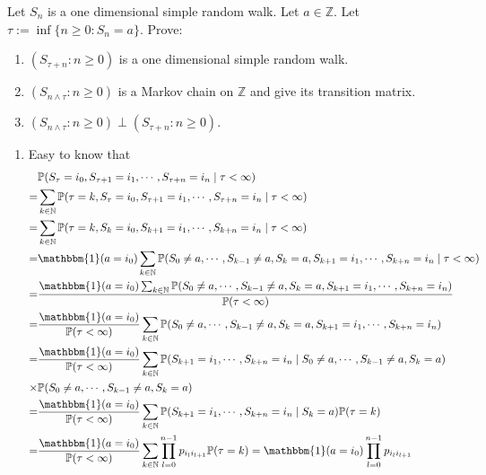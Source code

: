 \documentclass{ctexart}
\begin{document}
\begin{problem}\label{pro:2}
  Let \(S_n\) is a one dimensional simple random walk. Let \(a \in \mathbb{Z}\).
  Let \(\tau := \inf \{n \geq 0: S_n =a\}\).
  Prove:
  \begin{enumerate}
    \item \((S_{\tau + n}:n \geq 0)\) is a one dimensional simple random walk.
    \item \((S_{n \wedge \tau }:n \geq 0)\) is a Markov chain on \(\mathbb{Z}\) and give its
      transition matrix.
    \item \((S_{n \wedge \tau}:n \geq 0) \perp (S_{\tau + n}: n \geq 0)\).
  \end{enumerate}
\end{problem}
\begin{solution}
  \begin{enumerate}
    \item Easy to know that
      \[
        \begin{aligned}
           & \mathbb{P}(S_\tau=i_0,S_{\tau+1}=i_1,\cdots,S_{\tau+n}=i_n \mid \tau<\infty)
          \\= & \sum_{k \in \mathbb{N}}\mathbb{P}(\tau=k,S_\tau=i_0,S_{\tau+1}=i_1,\cdots,S_{\tau+n}=i_n \mid \tau<\infty)
          \\= & \sum_{k \in \mathbb{N}}\mathbb{P}(\tau=k,S_k=i_0,S_{k+1}=i_1,\cdots,S_{k+n}=i_n \mid \tau<\infty)
          \\= & \mathbbm{1}(a=i_0) \sum_{k \in \mathbb{N}}\mathbb{P}(S_0 \neq a,\cdots,S_{k-1}\neq a,S_k=a,S_{k+1}=i_1,\cdots,S_{k+n}=i_n \mid \tau<\infty)
          \\= & \frac{\mathbbm{1}(a=i_0) \sum_{k \in \mathbb{N}}\mathbb{P}(S_0 \neq a,\cdots,S_{k-1}\neq a,S_k=a,S_{k+1}=i_1,\cdots,S_{k+n}=i_n )}{\mathbb{P}(\tau<\infty)}
          \\= & \frac{\mathbbm{1}(a=i_0)}{\mathbb{P}(\tau<\infty)} \sum_{k \in \mathbb{N}}\mathbb{P}(S_0 \neq a,\cdots,S_{k-1}\neq a,S_k=a,S_{k+1}=i_1,\cdots,S_{k+n}=i_n)
          \\= & \frac{\mathbbm{1}(a=i_0)}{\mathbb{P}(\tau<\infty)} \sum_{k \in \mathbb{N}}\mathbb{P}(S_{k+1}=i_1,\cdots,S_{k+n}=i_n \mid S_0 \neq a,\cdots,S_{k-1}\neq a,S_k=a)
          \\ \times & \mathbb{P}(S_0 \neq a,\cdots,S_{k-1}\neq a,S_k=a)
          \\= & \frac{\mathbbm{1}(a=i_0)}{\mathbb{P}(\tau<\infty)} \sum_{k \in \mathbb{N}}\mathbb{P}(S_{k+1}=i_1,\cdots,S_{k+n}=i_n \mid S_k=a) \mathbb{P}(\tau=k)
          \\= & \frac{\mathbbm{1}(a=i_0)}{\mathbb{P}(\tau<\infty)} \sum_{k \in \mathbb{N}}\prod_{l=0}^{n-1} p_{i_l i_{l+1}} \mathbb{P}(\tau=k)=\mathbbm{1}(a=i_0) \prod_{l=0}^{n-1} p_{i_l i_{l+1}}

\end{aligned}\]
\end{enumerate}
\end{solution}
\end{document}
